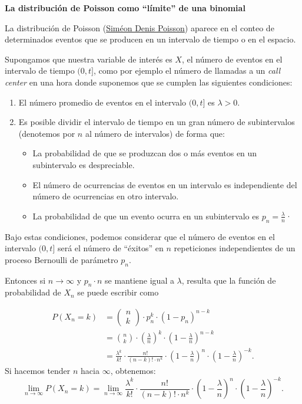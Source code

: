 \documentclass[
  letterpaper,
  DIV=11,
  numbers=noendperiod]{scrreprt}
\providecommand{\tightlist}{%
  \setlength{\itemsep}{0pt}\setlength{\parskip}{0pt}}\usepackage{longtable,booktabs,array}
\begin{document}
\textbf{La distribución de Poisson como ``límite'' de una binomial}

La distribución de Poisson
(\href{https://es.wikipedia.org/wiki/Sim\%C3\%A9on_Denis_Poisson}{Siméon
Denis Poisson}) aparece en el conteo de determinados eventos que se
producen en un intervalo de tiempo o en el espacio.

Supongamos que nuestra variable de interés es \(X\), el número de
eventos en el intervalo de tiempo \((0,t]\), como por ejemplo el número
de llamadas a un \emph{call center} en una hora donde suponemos que se
cumplen las siguientes condiciones:

\begin{enumerate}
\def\labelenumi{\arabic{enumi}.}
\tightlist
\item
  El número promedio de eventos en el intervalo \((0,t]\) es
  \(\lambda>0\).
\item
  Es posible dividir el intervalo de tiempo en un gran número de
  subintervalos (denotemos por \(n\) al número de intervalos) de forma
  que:

  \begin{itemize}
  \tightlist
  \item
    La probabilidad de que se produzcan dos o más eventos en un
    subintervalo es despreciable.
  \item
    El número de ocurrencias de eventos en un intervalo es independiente
    del número de ocurrencias en otro intervalo.
  \item
    La probabilidad de que un evento ocurra en un subintervalo es
    \(p_n=\frac{\lambda}{n}\)·
  \end{itemize}
\end{enumerate}

Bajo estas condiciones, podemos considerar que el número de eventos en
el intervalo \((0,t]\) será el número de ``éxitos'' en \(n\)
repeticiones independientes de un proceso Bernoulli de parámetro
\(p_n\).

Entonces si \(n\to\infty\) y \(p_n\cdot n\) se mantiene igual a
\(\lambda\), resulta que la función de probabilidad de \(X_n\) se puede
escribir como

\[
\begin{array}{rl}
P(X_n=k)&=\left(\begin{array}{c} n\\ k\end{array}\right) \cdot p_n^k\cdot  (1-p_n)^{n-k}
\\
&= {n\choose k}\cdot \left(\frac{\lambda}{n}\right)^{k}\cdot \left(1-\frac{\lambda}{n}\right)^{n-k}\\
&=
\frac{\lambda^k}{k!}\cdot\frac{n!}{(n-k)!\cdot n^k}\cdot
\left(1-\frac{\lambda}{n}\right)^{n}\cdot \left(1-\frac{\lambda}{n}\right)^{-k}.
\end{array}
\] Si hacemos tender \(n\) hacia \(\infty\), obtenemos: \[
\displaystyle\lim_{n\to \infty} P(X_n=k) = \lim_{n\to \infty} \frac{\lambda^k}{k!}\cdot\frac{n!}{(n-k)!\cdot n^k} \cdot
\left(1-\frac{\lambda}{n}\right)^{n}\cdot \left(1-\frac{\lambda}{n}\right)^{-k}.
\]
\end{document}

